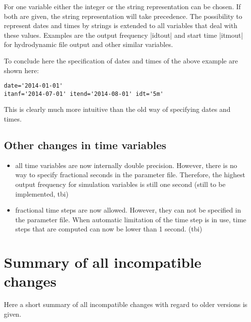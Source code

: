 \documentclass[12pt,draft]{article}
\begin{document}
For one variable either the integer or the string representation 
can be chosen. If both are given, the string representation
will take precedence. The possibility to represent dates and times
by strings is extended to all variables that deal with these 
values. Examples are the output frequency |idtout| 
and start time |itmout| for
hydrodynamic file output and other similar variables.

To conclude here the specification of dates and times of the
above example are shown here:
\begin{verbatim}
date='2014-01-01' 
itanf='2014-07-01' itend='2014-08-01' idt='5m' 
\end{verbatim}
This is clearly much more intuitive than the old 
way of specifying dates and times.






\subsection{Other changes in time variables}


\begin{itemize}
\item all time variables are now internally double precision. 
However, there is no way to specify fractional seconds
in the parameter file. Therefore, the highest output
frequency for simulation variables is still one second
(still to be implemented, tbi)
\item fractional time steps are now allowed. However, they can
not be specified in the parameter file. 
When automatic limitation of the time step is in use, time
steps that are computed can now be lower than 1 second. (tbi)

\end{itemize}



\section{Summary of all incompatible changes}

Here a short summary of all incompatible changes with
regard to older versions is given.
\end{document}
